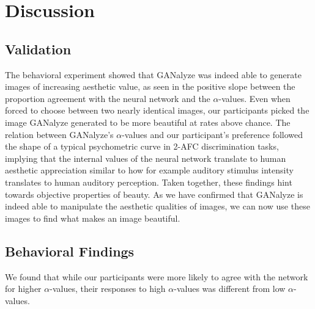\documentclass[../main.tex]{subfiles}
\begin{document}
\section{Discussion}

\subsection{Validation}
The behavioral experiment showed that GANalyze was indeed able to generate images of increasing aesthetic value, as seen in the positive slope between the proportion agreement with the neural network and the $\alpha$-values. Even when forced to choose between two nearly identical images, our participants picked the image GANalyze generated to be more beautiful at rates above chance. The relation between GANalyze's $\alpha$-values and our participant's preference followed the shape of a typical psychometric curve in 2-AFC discrimination tasks, implying that the internal values of the neural network translate to human aesthetic appreciation similar to how for example auditory stimulus intensity translates to human auditory perception.  Taken together, these findings hint towards objective properties of beauty. As we have confirmed that GANalyze is indeed able to manipulate the aesthetic qualities of images, we can now use these images to find what makes an image beautiful.

\subsection{Behavioral Findings}
We found that while our participants were more likely to agree with the network for higher $\alpha$-values, their responses to high $\alpha$-values was different from low $\alpha$-values.




\end{document}
